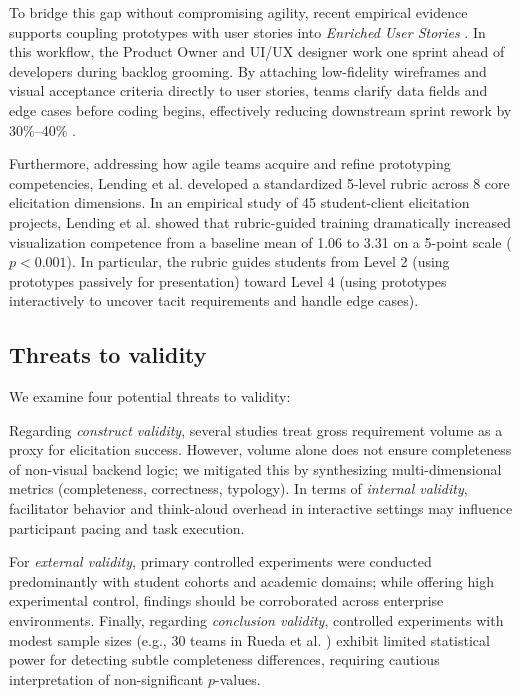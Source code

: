 To bridge this gap without compromising agility, recent empirical evidence supports coupling prototypes with user stories into \textit{Enriched User Stories} \cite{acm2022proposal}. In this workflow, the Product Owner and UI/UX designer work one sprint ahead of developers during backlog grooming. By attaching low-fidelity wireframes and visual acceptance criteria directly to user stories, teams clarify data fields and edge cases before coding begins, effectively reducing downstream sprint rework by 30\%--40\% \cite{acm2022proposal}.

Furthermore, addressing how agile teams acquire and refine prototyping competencies, Lending et al. \cite{lending2022rubric} developed a standardized 5-level rubric across 8 core elicitation dimensions. In an empirical study of 45 student-client elicitation projects, Lending et al. showed that rubric-guided training dramatically increased visualization competence from a baseline mean of 1.06 to 3.31 on a 5-point scale ($p < 0.001$). In particular, the rubric guides students from Level 2 (using prototypes passively for presentation) toward Level 4 (using prototypes interactively to uncover tacit requirements and handle edge cases).

\subsection{Threats to validity}
We examine four potential threats to validity:

Regarding \textit{construct validity}, several studies treat gross requirement volume as a proxy for elicitation success. However, volume alone does not ensure completeness of non-visual backend logic; we mitigated this by synthesizing multi-dimensional metrics (completeness, correctness, typology). In terms of \textit{internal validity}, facilitator behavior and think-aloud overhead in interactive settings \cite{abad2018loud} may influence participant pacing and task execution.

For \textit{external validity}, primary controlled experiments \cite{rueda2020requirements, diaz2021gender, uv2023empirical} were conducted predominantly with student cohorts and academic domains; while offering high experimental control, findings should be corroborated across enterprise environments. Finally, regarding \textit{conclusion validity}, controlled experiments with modest sample sizes (e.g., 30 teams in Rueda et al. \cite{rueda2020requirements}) exhibit limited statistical power for detecting subtle completeness differences, requiring cautious interpretation of non-significant $p$-values.


